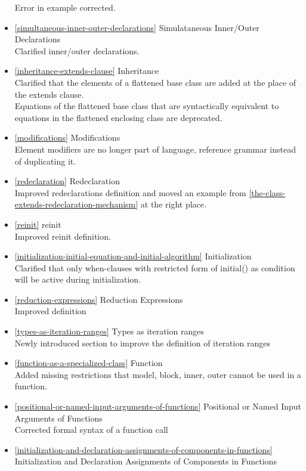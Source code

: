 \begin{itemize}
  Error in example corrected.
\item
  \ref{simultaneous-inner-outer-declarations} Simulataneous Inner/Outer Declarations\\
  Clarified inner/outer declarations.
\item
  \ref{inheritance-extends-clause} Inheritance\\
  Clarified that the elements of a flattened base class are added at the
  place of the extends clause.\\
  Equations of the flattened base class that are syntactically
  equivalent to equations in the flattened enclosing class are
  deprecated.
\item
  \ref{modifications} Modifications\\
  Element modifiers are no longer part of language, reference grammar
  instead of duplicating it.
\item
  \ref{redeclaration} Redeclaration\\
  Improved redeclarations definition and moved an example from \ref{the-class-extends-redeclaration-mechanism} at
  the right place.
\item
  \ref{reinit} reinit\\
  Improved reinit definition.
\item
  \ref{initialization-initial-equation-and-initial-algorithm} Initialization\\
  Clarified that only when-clauses with restricted form of initial() as
  condition will be active during initialization.
\item
  \ref{reduction-expressions} Reduction Expressions\\
  Improved definition
\item
  \ref{types-as-iteration-ranges} Types as iteration ranges\\
  Newly introduced section to improve the definition of iteration ranges
\item
  \ref{function-as-a-specialized-class} Function\\
  Added missing restrictions that model, block, inner, outer cannot be
  used in a function.
\item
  \ref{positional-or-named-input-arguments-of-functions} Positional or Named Input Arguments of Functions\\
  Corrected formal syntax of a function call
\item
  \ref{initialization-and-declaration-assignments-of-components-in-functions} Initialization and Declaration Assignments of
  Components in Functions\\

\end{itemize}
